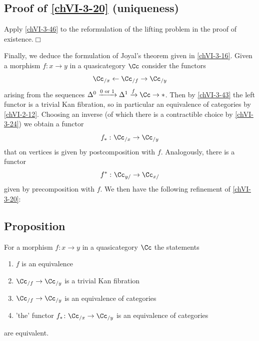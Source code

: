     \subsection{Proof of \ref{chVI-3-20} (uniqueness)}
        Apply \ref{chVI-3-46} to the reformulation of the lifting problem in the proof of existence.\hfill$\Box$
        \medskip

        Finally, we deduce the formulation of Joyal's theorem given in \ref{chVI-3-16}. Given a morphism $f \colon x \to y$ in a quasicategory $\Cc$ consider the functors
        \begin{equation*}
            \Cc_{/ x} \leftarrow \Cc_{/ f} \rightarrow \Cc_{/ y} 
        \end{equation*}
        arising from the sequences $\Delta^0 \xrightarrow{0 \text{ or } 1} \Delta^1 \xrightarrow{f} \Cc \rightarrow *$. Then by \ref{chVI-3-43} the left functor is a trivial Kan fibration, so in particular an equivalence of categories by \ref{chVI-2-12}. Choosing an inverse (of which there is a contractible choice by \ref{chVI-3-24}) we obtain a functor
        \begin{equation*}
            f_* \,\colon \Cc_{/ x} \to \Cc_{/ y}
        \end{equation*}
        that on vertices is given by postcomposition with $f$. Analogously, there is a functor
        \begin{equation*}
            f^* \,\colon \Cc_{y /} \to \Cc_{x /}
        \end{equation*}
        given by precomposition with $f$. We then have the following refinement of \ref{chVI-3-20}:

    \subsection{Proposition}\label{chVI-3-47}
        For a morphism $f \colon x \to y$ in a quasicategory $\Cc$ the statements
        \begin{enumerate}[label=\roman*)]
            \item 
                $f$ is an equivalence \label{chVI-3-47-i}
            \item 
                $\Cc_{/ f} \to \Cc_{/ y}$ is a trivial Kan fibration \label{chVI-3-47-ii}
            \item 
                $\Cc_{/ f} \to \Cc_{/ y}$ is an equivalence of categories \label{chVI-3-47-iii}
            \item 
                'the' functor $f_* \colon \Cc_{/ x} \to \Cc_{/ y}$ is an equivalence of categories \label{chVI-3-47-iv}
        \end{enumerate}	
        are equivalent.
        \smallskip

